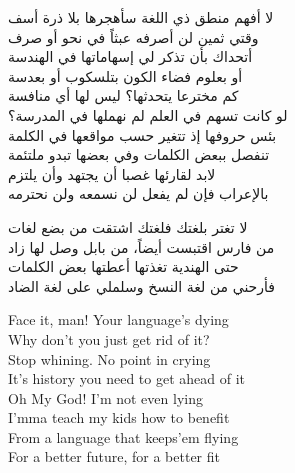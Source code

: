 \documentclass[a4paper,12pt]{article}
\begin{document}
\begin{tcolorbox}[colback=boxcolor,colframe=headercolor,title=\textbf{Stanza 1},breakable]
{لا أفهم منطق ذي اللغة سأهجرها بلا ذرة أسف \\
وقتي ثمين لن أصرفه عبثاً في نحو أو صرف \\
أتحداك بأن تذكر لي إسهاماتها في الهندسة \\
أو بعلوم فضاء الكون بتلسكوب أو بعدسة \\
كم مخترعا يتحدثها؟ ليس لها أي منافسة \\
لو كانت تسهم في العلم لم نهملها في المدرسة؟ \\
بئس حروفها إذ تتغير حسب مواقعها في الكلمة \\
تنفصل ببعض الكلمات وفي بعضها تبدو ملتئمة \\
لابد لقارئها غصبا أن يجتهد وأن يلتزم \\
بالإعراب فإن لم يفعل لن نسمعه ولن نحترمه \\
}
\end{tcolorbox}

\begin{tcolorbox}[colback=boxcolor,colframe=headercolor,title=\textbf{Stanza 2} ,breakable]
\textarabic{
لا تغتر بلغتك فلغتك اشتقت من بضع لغات \\
من فارس اقتبست أيضاً، من بابل وصل لها زاد \\
حتى الهندية تغذتها أعطتها بعض الكلمات \\
فأرحني من لغة النسخ وسلملي على لغة الضاد \\
}
\end{tcolorbox}

\begin{tcolorbox}[colback=boxcolor,colframe=headercolor,title=\textbf{Chorus (English)},breakable]
Face it, man! Your language's dying \\
Why don't you just get rid of it? \\
Stop whining. No point in crying \\
It's history you need to get ahead of it \\
Oh My God! I'm not even lying \\
I'mma teach my kids how to benefit \\
From a language that keeps'em flying \\
For a better future, for a better fit \\
\end{tcolorbox}
\end{document}
